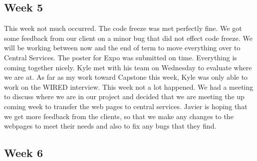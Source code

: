 \documentclass[letterpaper,10pt,serif,draftclsnofoot,onecolumn,compsoc,titlepage]{IEEEtran}
\begin{document}
\subsection{Week 5}
This week not much occurred. The code freeze was met perfectly fine. We got some feedback from our
 client on a minor bug that did not effect code freeze. We will be working between now and the end
 of term to move everything over to Central Services. The poster for Expo was submitted on time.
 Everything is coming together nicely.
 Kyle met with his team on Wednesday to evaluate where we are at. As far as my work toward Capstone 
 this week, Kyle was only able to work on the WIRED interview.
 This week not a lot happened. We had a meeting to discuss where we are in our project and decided
 that we are meeting the up coming week to transfer the web pages to central services. Javier is
 hoping that we get more feedback from the clients, so that we make any changes to the webpages to
 meet their needs and also to fix any bugs that they find.
\subsection{Week 6}
\newpage
%
%
\end{document}
